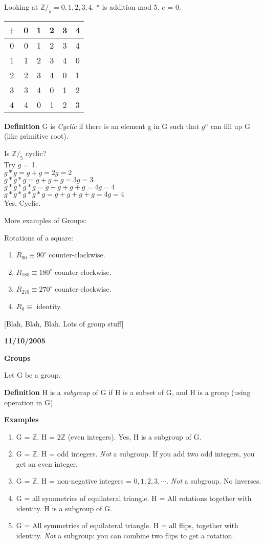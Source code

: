 Looking at $\mathbb{Z}/_5 = {0,1,2,3,4}$. * is addition mod 5. $e$ = 0. \\
\begin{tabular}{|c|c|c|c|c|c|}\hline
+ & 0 & 1 & 2 & 3 & 4 \\ \hline
0 & 0 & 1 & 2 & 3 & 4 \\ \hline
1 & 1 & 2 & 3 & 4 & 0 \\ \hline
2 & 2 & 3 & 4 & 0 & 1 \\ \hline
3 & 3 & 4 & 0 & 1 & 2 \\ \hline
4 & 4 & 0 & 1 & 2 & 3 \\ \hline
\end{tabular}

\textbf{Definition} G is \textit{Cyclic} if there is an element g in G such that $g^n$ can fill up G (like primitive root).

Is $\mathbb{Z}/_5$ cyclic?\\
Try $g$ = 1. \\
$g * g = g + g = 2g = 2$\\
$g * g * g = g + g + g= 3g = 3$\\
$g * g * g * g = g + g + g + g = 4g = 4$\\
$g * g * g * g * g = g + g + g + g = 4g = 4$\\
Yes, Cyclic.

More examples of Groups:

Rotations of a square:
\begin{enumerate}
\item $R_{90} \equiv 90^\circ$ counter-clockwise.
\item $R_{180} \equiv 180^\circ$ counter-clockwise.
\item $R_{270} \equiv 270^\circ$ counter-clockwise.
\item $R_{0} \equiv $ identity.
\end{enumerate}

[Blah, Blah, Blah. Lots of group stuff]

\textbf{11/10/2005}

\textbf{Groups}

Let G be a group.

\textbf{Definition} H is a \textit{subgroup} of G if H is a subset of G, and H is a group (using operation in G)

\textbf{Examples} 
\begin{enumerate}
\item G = $\mathbb{Z}$. H = $2\mathbb{Z}$ (even integers). Yes, H is a subgroup of G.
\item G = $\mathbb{Z}$. H = odd integers. \textit{Not} a subgroup. If you add two odd integers, you get an even integer.
\item G = $\mathbb{Z}$. H = non-negative integers = ${0,1,2,3,\cdots}$. \textit{Not} a subgroup. No inverses.
\item G = all symmetries of equilateral triangle. H = All rotations together with identity. H is a subgroup of G.
\item G = All symmetries of equilateral triangle. H = all flips, together with identity. \textit{Not} a subgroup: you can combine two flips to get a rotation.
\end{enumerate}


